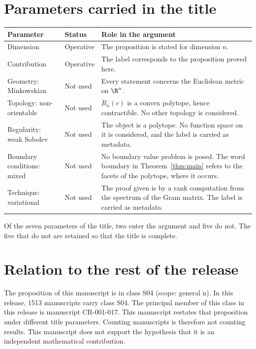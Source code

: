 \documentclass[11pt]{article}
\begin{document}
\section{Parameters carried in the title}\label{sec:params}
\begin{center}
\small
\begin{tabular}{p{}p{}p{}}
\toprule
Parameter & Status & Role in the argument \\
\midrule
Dimension & Operative & The proposition is stated for dimension $n$. \\
Contribution & Operative & The label corresponds to the proposition proved here. \\
Geometry: Minkowskian & Not used & Every statement concerns the Euclidean metric on $\R^n$. \\
Topology: non-orientable & Not used & $R_n(c)$ is a convex polytope, hence contractible. No other topology is considered. \\
Regularity: weak Sobolev & Not used & The object is a polytope. No function space on it is considered, and the label is carried as metadata. \\
Boundary conditions: mixed & Not used & No boundary value problem is posed. The word boundary in Theorem~\ref{thm:main} refers to the facets of the polytope, where it occurs. \\
Technique: variational & Not used & The proof given is by a rank computation from the spectrum of the Gram matrix. The label is carried as metadata. \\
\bottomrule
\end{tabular}
\end{center}
Of the seven parameters of the title, two enter the argument and five do not. The five that do not are retained so that the title is complete.

\section{Relation to the rest of the release}
The proposition of this manuscript is in class S04 (scope: general n).
In this release, 1513 manuscripts carry class S04. The principal member of this class in this release is manuscript CR-001-017. This manuscript restates that proposition under different title parameters.
Counting manuscripts is therefore not counting results. This manuscript does not support the hypothesis that it is an independent mathematical contribution.
\end{document}
